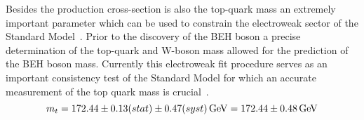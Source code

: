 Besides the production cross-section is also the top-quark mass an extremely important parameter which can be used to constrain the electroweak sector of the Standard Model~\cite{ElectroweakFit}. %
Prior to the discovery of the BEH boson a precise determination of the top-quark and W-boson mass allowed for the prediction of the BEH boson mass. Currently this electroweak fit procedure serves as an important consistency test of the Standard Model for which an accurate measurement of the top quark mass is crucial~\cite{CMSTopMass}.
\begin{equation}
 m_t = 172.44 \pm 0.13 (stat) \pm 0.47 (syst) \, \mathrm{GeV} = 172.44 \pm 0.48 \, \mathrm{GeV}
\end{equation}

